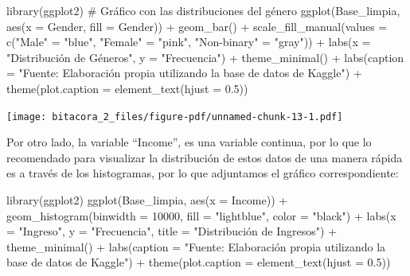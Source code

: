 \documentclass[
  letterpaper,
  DIV=11,
  numbers=noendperiod]{scrreprt}
\newenvironment{Shaded}{\begin{snugshade}}{\end{snugshade}}
\newcommand{\AttributeTok}[1]{\textcolor[rgb]{0.40,0.45,0.13}{#1}}
\newcommand{\CommentTok}[1]{\textcolor[rgb]{0.37,0.37,0.37}{#1}}
\newcommand{\DecValTok}[1]{\textcolor[rgb]{0.68,0.00,0.00}{#1}}
\newcommand{\FloatTok}[1]{\textcolor[rgb]{0.68,0.00,0.00}{#1}}
\newcommand{\FunctionTok}[1]{\textcolor[rgb]{0.28,0.35,0.67}{#1}}
\newcommand{\NormalTok}[1]{\textcolor[rgb]{0.00,0.23,0.31}{#1}}
\newcommand{\OtherTok}[1]{\textcolor[rgb]{0.00,0.23,0.31}{#1}}
\newcommand{\SpecialCharTok}[1]{\textcolor[rgb]{0.37,0.37,0.37}{#1}}
\newcommand{\StringTok}[1]{\textcolor[rgb]{0.13,0.47,0.30}{#1}}
\begin{document}
\begin{Shaded}
\begin{Highlighting}[]
\FunctionTok{library}\NormalTok{(ggplot2)}
\CommentTok{\# Gráfico con las distribuciones del género}
\FunctionTok{ggplot}\NormalTok{(Base\_limpia, }\FunctionTok{aes}\NormalTok{(}\AttributeTok{x =}\NormalTok{ Gender, }\AttributeTok{fill =}\NormalTok{ Gender)) }\SpecialCharTok{+}
  \FunctionTok{geom\_bar}\NormalTok{() }\SpecialCharTok{+}
  \FunctionTok{scale\_fill\_manual}\NormalTok{(}\AttributeTok{values =} \FunctionTok{c}\NormalTok{(}\StringTok{"Male"} \OtherTok{=} \StringTok{"blue"}\NormalTok{, }\StringTok{"Female"} \OtherTok{=} \StringTok{"pink"}\NormalTok{, }\StringTok{"Non{-}binary"} \OtherTok{=} \StringTok{"gray"}\NormalTok{)) }\SpecialCharTok{+}
  \FunctionTok{labs}\NormalTok{(}\AttributeTok{x =} \StringTok{"Distribución de Géneros"}\NormalTok{, }\AttributeTok{y =} \StringTok{"Frecuencia"}\NormalTok{) }\SpecialCharTok{+} \FunctionTok{theme\_minimal}\NormalTok{() }\SpecialCharTok{+}
  \FunctionTok{labs}\NormalTok{(}\AttributeTok{caption =} \StringTok{"Fuente: Elaboración propia utilizando la base de datos de Kaggle"}\NormalTok{) }\SpecialCharTok{+}
\FunctionTok{theme}\NormalTok{(}\AttributeTok{plot.caption =} \FunctionTok{element\_text}\NormalTok{(}\AttributeTok{hjust =} \FloatTok{0.5}\NormalTok{)) }
\end{Highlighting}
\end{Shaded}

\texttt{[image: bitacora\_2\_files/figure-pdf/unnamed-chunk-13-1.pdf]}

Por otro lado, la variable ``Income'', es una variable continua, por lo
que lo recomendado para visualizar la distribución de estos datos de una
manera rápida es a través de los histogramas, por lo que adjuntamos el
gráfico correspondiente:

\begin{Shaded}
\begin{Highlighting}[]
\FunctionTok{library}\NormalTok{(ggplot2)}
\FunctionTok{ggplot}\NormalTok{(Base\_limpia, }\FunctionTok{aes}\NormalTok{(}\AttributeTok{x =}\NormalTok{ Income)) }\SpecialCharTok{+} 
  \FunctionTok{geom\_histogram}\NormalTok{(}\AttributeTok{binwidth =} \DecValTok{10000}\NormalTok{, }\AttributeTok{fill =} \StringTok{"lightblue"}\NormalTok{, }\AttributeTok{color =} \StringTok{"black"}\NormalTok{) }\SpecialCharTok{+} 
  \FunctionTok{labs}\NormalTok{(}\AttributeTok{x =} \StringTok{"Ingreso"}\NormalTok{, }\AttributeTok{y =} \StringTok{"Frecuencia"}\NormalTok{, }\AttributeTok{title =} \StringTok{"Distribución de Ingresos"}\NormalTok{) }\SpecialCharTok{+}
 \FunctionTok{theme\_minimal}\NormalTok{() }\SpecialCharTok{+}
  \FunctionTok{labs}\NormalTok{(}\AttributeTok{caption =} \StringTok{"Fuente: Elaboración propia utilizando la base de datos de Kaggle"}\NormalTok{) }\SpecialCharTok{+}
\FunctionTok{theme}\NormalTok{(}\AttributeTok{plot.caption =} \FunctionTok{element\_text}\NormalTok{(}\AttributeTok{hjust =} \FloatTok{0.5}\NormalTok{)) }
\end{Highlighting}
\end{Shaded}
\end{document}
